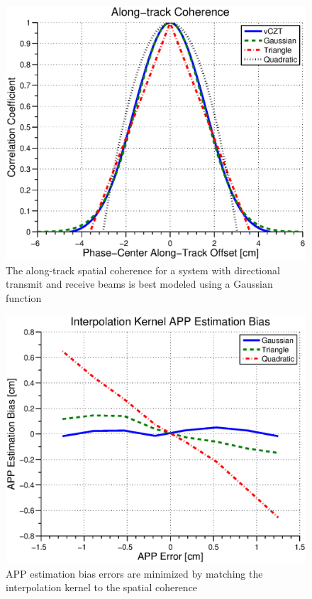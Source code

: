 \documentclass[conference]{IEEEtran}
\begin{document}
\begin{figure}[t]
    \centering
    \includegraphics[width=\columnwidth]{sasCoherence.eps}
    \caption{The along-track spatial coherence for a system with directional transmit and receive beams is best modeled using a Gaussian function}\label{fig:sasCoherence}
\end{figure}

\begin{figure}[t]
    \centering
    \includegraphics[width=\columnwidth]{dpcBias.eps}
    \caption{APP estimation bias errors are minimized by matching the interpolation kernel to the spatial coherence}\label{fig:dpcBias}
\end{figure}
\end{document}
